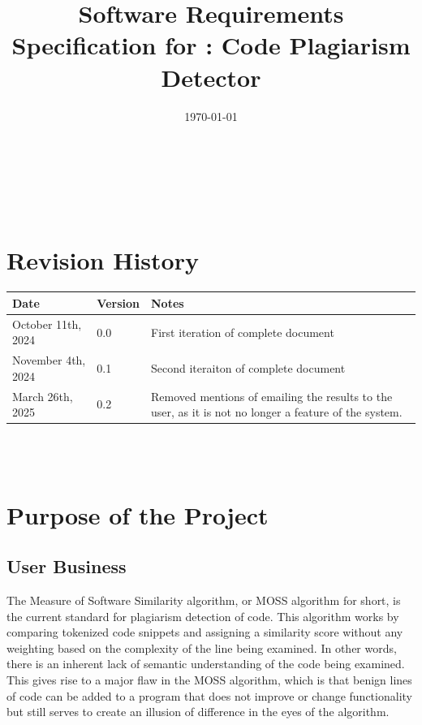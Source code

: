 \documentclass[12pt]{article}
\begin{document}
\title{Software Requirements Specification for \progname: Code Plagiarism Detector} 
\author{\authname}
\date{\today}
	
\maketitle

~\newpage


\tableofcontents

~\newpage

\section*{Revision History}

\begin{tabularx}{\textwidth}{p{3cm}p{2cm}X}
\toprule {\textbf{Date}} & {\textbf{Version}} & {\textbf{Notes}}\\
\midrule
October 11th, 2024 & 0.0 & First iteration of complete document\\
November 4th, 2024 & 0.1 & Second iteraiton of complete document\\
March 26th, 2025 & 0.2 & Removed mentions of emailing the results to the user, as it is not no longer a feature of the system.\\
\bottomrule
\end{tabularx}

~\\

~\newpage
\section{Purpose of the Project}
\subsection{User Business}

The Measure of Software Similarity algorithm, or MOSS algorithm for short, is
the current standard for plagiarism detection of code. This
algorithm works by comparing tokenized code snippets and assigning a similarity
score without any weighting based on the complexity of the line being examined.
In other words, there is an inherent lack of semantic understanding of the code
being examined. This gives rise to a major flaw in the MOSS algorithm, which is
that benign lines of code can be added to a program that does not improve or
change functionality but still serves to create an illusion of difference in the
eyes of the algorithm. 
\end{document}

